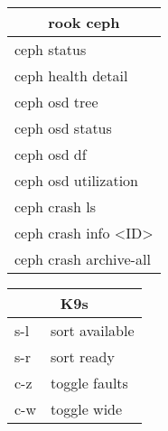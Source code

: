 \documentclass[12pt,paper=landscape,paper=a4]{scrartcl}
\begin{document}
\begin{multicols}{3}
    \vspace{1em}

    \begin{tabular}{l}
        \multicolumn{1}{c}{rook ceph}\\
        \hline
        ceph status\\
        ceph health detail\\
        ceph osd tree\\
        ceph osd status\\
        ceph osd df\\
        ceph osd utilization\\
        ceph crash ls\\
        ceph crash info \textless{}ID\textgreater\\
        ceph crash archive-all\\
    \end{tabular}

    \vspace{1em}

    \begin{tabular}{ll}
        \multicolumn{2}{c}{K9s}\\
        \hline
        s-l  & sort available\\
        s-r  & sort ready\\
        c-z  & toggle faults\\
        c-w  & toggle wide\\
    \end{tabular}

    \vspace{1em}


\end{multicols}
\end{document}
